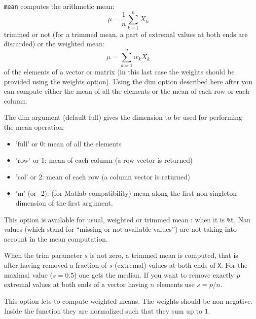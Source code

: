 \begin{mandescription}
  \verb+mean+ computes the arithmetic mean:
$$
    \mu = \frac{1}{n} \sum_{k=1}^n X_k 
$$ 
trimmed or not (for a trimmed mean, a part of extremal values at both ends are discarded) 
or the weighted mean:
$$
    \mu = \sum_{k=1}^n w_k X_k 
$$
of the elements of a vector or matrix (in this last case the weights should be provided
using the weights option). Using the dim option described here after you can compute either
the mean of all the elements or the mean of each row or each column. 

  The dim argument (default full) gives the dimension to be used for performing the mean operation:
  \begin{itemize}
    \item 'full' or 0: mean of all the elements 
    \item 'row' or 1: mean of each column (a row vector is returned)
    \item 'col' or 2: mean of each row (a column vector is returned)
    \item 'm' (or -2): (for Matlab compatibility) mean along the first non 
          singleton dimension of the first argument.
  \end{itemize}

   This option is available for usual, weighted or trimmed mean : when it is \verb+%t+,  Nan values 
  (which stand for ``missing or not available values'') are not taking into account in the
   mean computation.

  When the trim parameter $s$ is not zero, a trimmed mean is computed, that is
  after having removed a fraction of $s$ (extremal) values at both ends of \verb+X+. For
  the maximal value ($s=0.5$) one gets the median. If you want to remove exactly $p$
  extremal values at both ends of a vector having $n$ elements use $s = p/n$.  
   
  This option lets to compute weighted means. The weights should be non negative. Inside
the function they are normalized such that they sum up to $1$.

\end{mandescription}
